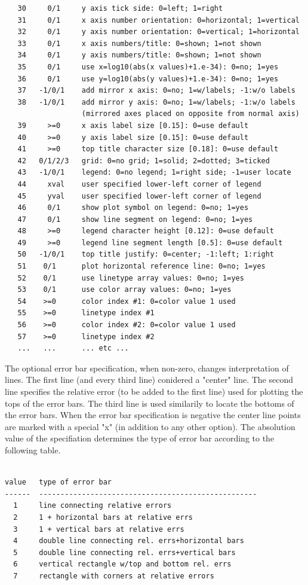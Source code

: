 \documentclass[11pt]{report}
\begin{document}
\begin{verbatim}
   30     0/1     y axis tick side: 0=left; 1=right
   31     0/1     x axis number orientation: 0=horizontal; 1=vertical
   32     0/1     y axis number orientation: 0=vertical; 1=horizontal
   33     0/1     x axis numbers/title: 0=shown; 1=not shown
   34     0/1     y axis numbers/title: 0=shown; 1=not shown
   35     0/1     use x=log10(abs(x values)+1.e-34): 0=no; 1=yes
   36     0/1     use y=log10(abs(y values)+1.e-34): 0=no; 1=yes
   37   -1/0/1    add mirror x axis: 0=no; 1=w/labels; -1:w/o labels
   38   -1/0/1    add mirror y axis: 0=no; 1=w/labels; -1:w/o labels
                  (mirrored axes placed on opposite from normal axis)
   39     >=0     x axis label size [0.15]: 0=use default
   40     >=0     y axis label size [0.15]: 0=use default
   41     >=0     top title character size [0.18]: 0=use default
   42   0/1/2/3   grid: 0=no grid; 1=solid; 2=dotted; 3=ticked
   43   -1/0/1    legend: 0=no legend; 1=right side; -1=user locate
   44     xval    user specified lower-left corner of legend
   45     yval    user specified lower-left corner of legend
   46     0/1     show plot symbol on legend: 0=no; 1=yes
   47     0/1     show line segment on legend: 0=no; 1=yes
   48     >=0     legend character height [0.12]: 0=use default
   49     >=0     legend line segment length [0.5]: 0=use default
   50   -1/0/1    top title justify: 0=center; -1:left; 1:right
   51    0/1      plot horizontal reference line: 0=no; 1=yes
   52    0/1      use linetype array values: 0=no; 1=yes
   53    0/1      use color array values: 0=no; 1=yes
   54    >=0      color index #1: 0=color value 1 used
   55    >=0      linetype index #1
   56    >=0      color index #2: 0=color value 1 used
   57    >=0      linetype index #2
   ...   ...      ... etc ...
\end{verbatim}

The optional error bar specification, when non-zero, changes
interpretation of lines.  The first line (and every third line)
conidered a "center" line.  The second line specifies the relative
error (to be added to the first line) used for plotting the tops
of the error bars.  The third line is used similarily to locate
the bottoms of the error bars.  When the error bar specification
is negative the center line points are marked with a special "x"
(in addition to any other option).  The absolution value of the
specifiation determines the type of error bar according to the
following table.
\begin{verbatim}

value   type of error bar
------  ---------------------------------------------------
  1     line connecting relative errors
  2     1 + horizontal bars at relative errs
  3     1 + vertical bars at relative errs
  4     double line connecting rel. errs+horizontal bars
  5     double line connecting rel. errs+vertical bars
  6     vertical rectangle w/top and bottom rel. errs
  7     rectangle with corners at relative errors
\end{verbatim}
\end{document}
